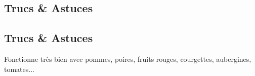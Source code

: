    \vspace{1cm}
    \hline
    \vspace{1cm}
    
    \subsection{Trucs \& Astuces}
        \subsection{Trucs \& Astuces}
	Fonctionne très bien avec pommes, poires, fruits rouges, courgettes, aubergines, tomates...
